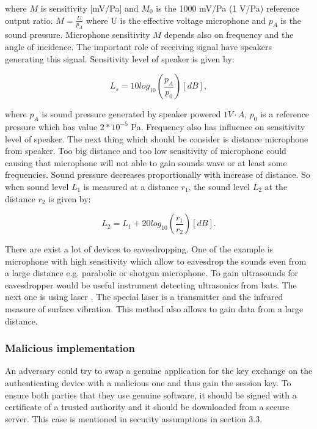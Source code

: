\documentclass[11pt,titlepage]{article}
\theoremstyle{plain}
\begin{document}
 where $M$ is sensitivity [mV/Pa] and $M_0$ is the 1000 mV/Pa (1 V/Pa) reference output ratio. $M = \frac{U}{p_A}$ where U is the effective voltage microphone and $p_A$ is the sound pressure. Microphone sensitivity $M$ depends also on frequency and the angle of incidence. The important role of receiving signal have speakers generating this signal. Sensitivity level of speaker is given by: 
 
 \begin{equation}
 L_s = 10 log_{10}\left(\frac{p_A}{p_0}\right)[dB],
 \end{equation}
 
 where $p_A$ is sound pressure generated by speaker powered $1V \cdot A$, $p_0$ is a reference pressure which has value $2*10^{-5}$ Pa. Frequency also has influence on sensitivity level of speaker. The next thing which should be consider is distance microphone from speaker. Too big distance and too low sensitivity of microphone could causing that microphone will not able to gain sounds wave or at least some frequencies. Sound pressure decreases proportionally with increase of distance. So when sound level $L_{1}$ is measured at a distance $r_1$, the sound level $L_2$ at the distance $r_2$ is given by:
 
 \begin{equation}
 L_2 = L_1 + 20 log_{10} \left(\frac{r_1}{r_2}\right)[dB].
 \end{equation}

There are exist a lot of devices to eavesdropping. One of the example is microphone with high sensitivity which allow to eavesdrop the sounds even from a large distance e.g. parabolic or shotgun  microphone. To gain ultrasounds for eavesdropper would be useful instrument detecting ultrasonics from bats. The next one is using laser \cite{laser_mic}. The special laser is a transmitter and the infrared measure of surface vibration. This method also allows to gain data from a large distance. 

\subsubsection{Malicious implementation}
An adversary could try to swap a genuine application for the key exchange on the authenticating device with a malicious one and thus gain the session key. To ensure both parties that they use genuine software, it should be signed with a certificate of a trusted authority and it should be downloaded from a secure server. This case is mentioned in security assumptions in section 3.3.
\end{document}

